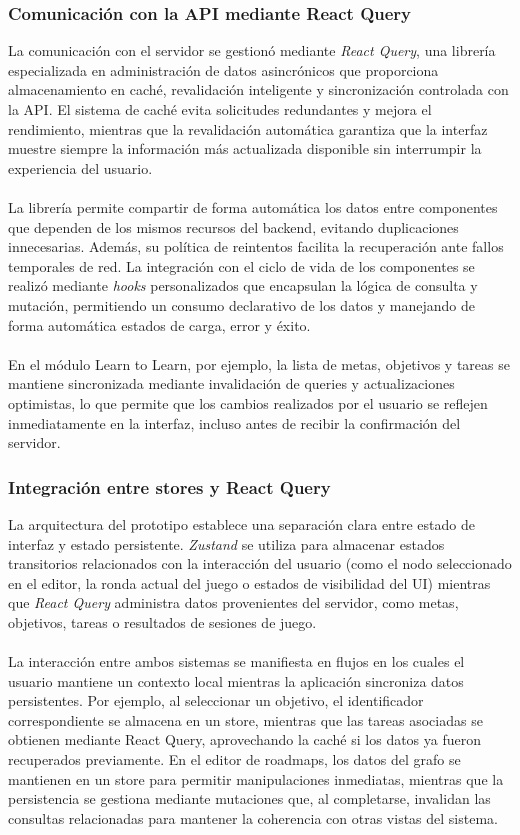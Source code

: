 \subsubsection{Comunicación con la API mediante React Query}

La comunicación con el servidor se gestionó mediante \textit{React Query}, una librería especializada en administración de datos asincrónicos que proporciona almacenamiento en caché, revalidación inteligente y sincronización controlada con la API. El sistema de caché evita solicitudes redundantes y mejora el rendimiento, mientras que la revalidación automática garantiza que la interfaz muestre siempre la información más actualizada disponible sin interrumpir la experiencia del usuario.
\\
\\
La librería permite compartir de forma automática los datos entre componentes que dependen de los mismos recursos del backend, evitando duplicaciones innecesarias. Además, su política de reintentos facilita la recuperación ante fallos temporales de red. La integración con el ciclo de vida de los componentes se realizó mediante \textit{hooks} personalizados que encapsulan la lógica de consulta y mutación, permitiendo un consumo declarativo de los datos y manejando de forma automática estados de carga, error y éxito.
\\
\\
En el módulo Learn to Learn, por ejemplo, la lista de metas, objetivos y tareas se mantiene sincronizada mediante invalidación de queries y actualizaciones optimistas, lo que permite que los cambios realizados por el usuario se reflejen inmediatamente en la interfaz, incluso antes de recibir la confirmación del servidor.

\subsubsection{Integración entre stores y React Query}

La arquitectura del prototipo establece una separación clara entre estado de interfaz y estado persistente. \textit{Zustand} se utiliza para almacenar estados transitorios relacionados con la interacción del usuario (como el nodo seleccionado en el editor, la ronda actual del juego o estados de visibilidad del UI) mientras que \textit{React Query} administra datos provenientes del servidor, como metas, objetivos, tareas o resultados de sesiones de juego.
\\
\\
La interacción entre ambos sistemas se manifiesta en flujos en los cuales el usuario mantiene un contexto local mientras la aplicación sincroniza datos persistentes. Por ejemplo, al seleccionar un objetivo, el identificador correspondiente se almacena en un store, mientras que las tareas asociadas se obtienen mediante React Query, aprovechando la caché si los datos ya fueron recuperados previamente. En el editor de roadmaps, los datos del grafo se mantienen en un store para permitir manipulaciones inmediatas, mientras que la persistencia se gestiona mediante mutaciones que, al completarse, invalidan las consultas relacionadas para mantener la coherencia con otras vistas del sistema.

